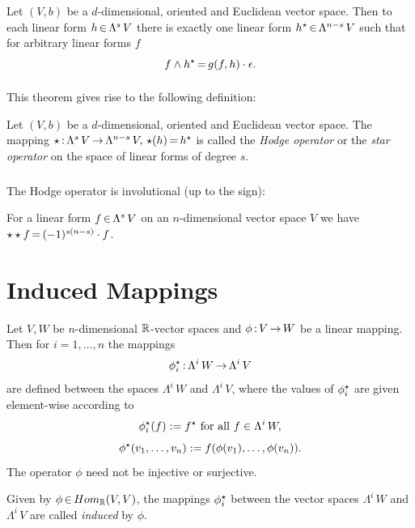 \documentclass[11pt,twoside]{article}
\begin{document}
\begin{theorem}
Let $(V,b)$ be a $d$-dimensional, oriented and Euclidean vector space.
Then to each linear form $h {\,\in\,} \Lambda^s\,V$
there is exactly one linear form $h^\star {\,\in\,} \Lambda^{n-s}\,V$
such that
for arbitrary linear forms $f$
\[
f \wedge h^\star {\,=\,} g(f,h) \cdot \epsilon.
\]
\end{theorem}

\paragraph{}
This theorem gives rise to the following definition:

\begin{definition}
Let $(V,b)$ be a $d$-dimensional, oriented and Euclidean vector space.
The mapping 
$\star {\,:\,} \Lambda^s\,V {\,\to\,} \Lambda^{n-s}\,V, \, \star(h) {\,=\,} h^\star$
is called the \textit{Hodge operator} or the \textit{star operator}
on the space of linear forms of degree $s$.
\end{definition}

\subparagraph{}
The Hodge operator is involutional (up to the sign):

\begin{theorem}
For a linear form $f {\,\in\,} \Lambda^s\,V$ on an $n$-dimensional
vector space $V$ we have
$\star\star f {\,=\,} (-1)^{s(n-s)} \cdot f$.
\end{theorem}

\section{Induced Mappings}
Let $V,W$ be $n$-dimensional ${\mathbb{R}}$-vector spaces and
$\phi {\,:\,} V {\,\to\,} W$ be a linear mapping.
Then for $i=1,\ldots,n$ the mappings
\[
\phi^\star_i {\,:\,} \Lambda^i \, W {\,\to\,} \Lambda^i \, V
\]
are defined between the spaces $\Lambda^i\,W$ and $\Lambda^i\,V$,
where the values of $\phi^\star_i$ are given element-wise
according to
\[
\phi^\star_i(f) := f^\star \mbox{ for all } f \in\Lambda^i \, W,
\]
\[
\phi^\star(v_1,\ldots,v_n) := f(\phi(v_1),\ldots,\phi(v_n)). 
\]
The operator $\phi$ need not be injective or surjective.

\begin{definition}
Given by $\phi {\,\in\,} Hom_{{\mathbb{R}}}(V,V)$,
the mappings $\phi^\star_i$
between the vector spaces $\Lambda^i\,W$ and $\Lambda^i\,V$
are called \textit{induced} by $\phi$.
\end{definition}
\end{document}
